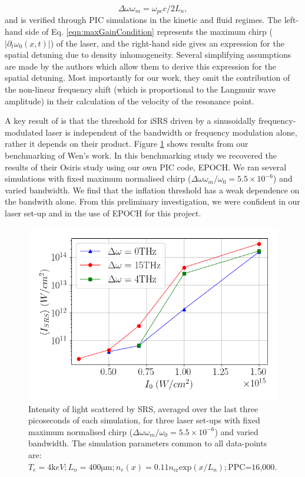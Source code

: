 \begin{equation}\label{eqn:maxGainCondition}
 \Delta\omega\omega_m = \omega_{pe}c / 2L_n,
\end{equation} and is verified through PIC simulations in the kinetic and fluid regimes. The left-hand side of Eq. \ref{eqn:maxGainCondition} represents the maximum chirp ($|\partial_t\omega_0(x,t)|$) of the laser, and the right-hand side gives an expression for the spatial detuning due to density inhomogeneity. Several simplifying assumptions are made by the authors which allow them to derive this expression for the spatial detuning. Most importantly for our work, they omit the contribution of the non-linear frequency shift (which is proportional to the Langmuir wave amplitude) in their calculation of the velocity of the resonance point. 

A key result of \citet{Wen2021} is that the threshold for iSRS driven by a sinusoidally frequency-modulated laser is independent of the bandwidth or frequency modulation alone, rather it depends on their product. Figure \ref{fig:Wenreplication} shows results from our benchmarking of Wen's work. In this benchmarking study we recovered the results of their Osiris study using our own PIC code, EPOCH. We ran several simulations with fixed maximum normalised chirp ($\Delta\omega \omega_m / \omega_0=5.5\times10^{-6}$) and varied bandwidth. We find that the inflation threshold has a weak dependence on the bandwith alone. From this preliminary investigation, we were confident in our laser set-up and in the use of EPOCH for this project.


\begin{figure}[ht]
   \centering
    \includegraphics[width=0.75\columnwidth]{Chapters/C5_broadband/fig51_thesis.png}
    \caption{Intensity of light scattered by SRS, averaged over the last three picoseconds of each simulation, for three laser set-ups with fixed maximum normalised chirp ($\Delta\omega \omega_m / \omega_0=5.5\times10^{-6}$) and varied bandwidth. The simulation parameters common to all data-points are: $T_e = 4\si{\kilo eV}; L_n = 400\si{\micro\metre}; n_e(x) = 0.11n_{\text{cr}}\text{exp}(x/L_n);\text{PPC=16,000}. $}
    \label{fig:Wenreplication}
\end{figure}{}


